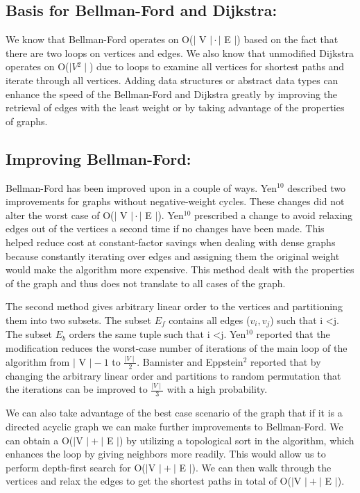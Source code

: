 \documentclass{article}
\begin{document}
\subsection{Basis for Bellman-Ford and Dijkstra:}

We know that Bellman-Ford operates on O($\mid$ V $\mid \cdot \mid$ E $\mid$) based  on the fact that there are two loops on vertices and edges.  We also know that unmodified Dijkstra operates on O($\mid V{^2} \mid$) due to loops to examine all vertices for shortest paths and iterate through all vertices.  Adding data structures or abstract data types can enhance the speed of the Bellman-Ford and Dijkstra greatly by improving the retrieval of edges with the least weight or by taking advantage of the properties of graphs.

\subsection{Improving Bellman-Ford:}
Bellman-Ford has been improved upon in a couple of ways.  Yen$^{10}$ described two improvements for graphs without negative-weight cycles.  These changes did not alter the worst case of O($\mid$ V $\mid \cdot \mid$ E $\mid$).  
Yen$^{10}$ prescribed a change to avoid relaxing edges out of the vertices a second time if no changes have been made. This helped reduce cost at constant-factor savings when dealing with dense graphs because constantly iterating over edges and assigning them the original weight would make the algorithm more expensive.  This method dealt with the properties of the graph and thus does not translate to all cases of the graph.


The second method gives arbitrary linear order to the vertices and partitioning them into two subsets.  The subset $E_f$ contains all edges ($v_i , v_j$)  such that i \textless j.  The subset $E_b$ orders the same tuple such that i \textless j.  Yen$^{10}$ reported that the modification reduces the worst-case number of iterations of the main loop of the algorithm from $\mid$ V $\mid - 1$ to $\frac{\mid V \mid}{2}$.  Bannister and Eppstein$^{2}$  reported that by changing the arbitrary linear order and partitions to random permutation that the iterations can be improved to $\frac{\mid V \mid}{3}$ with a high probability.


We can also take advantage of the best case scenario of the graph that if it is a directed acyclic graph we can make further improvements to Bellman-Ford.  We can obtain a O($\mid$V $\mid + \mid$ E $\mid$) by utilizing a topological sort in the algorithm, which enhances the loop by giving neighbors more readily.  This would allow us to perform depth-first search for O($\mid$V $\mid + \mid$ E $\mid$).  We can then walk through the vertices and relax the edges to get the shortest paths in total of O($\mid$V $\mid + \mid$ E $\mid$).
\end{document}
